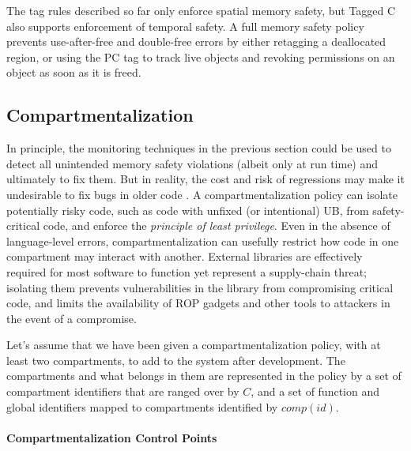 \documentclass{llncs}
\begin{document}
The tag rules described so far only enforce spatial memory safety, but Tagged C also
supports enforcement of temporal safety. A full memory safety policy prevents use-after-free and
double-free errors by either retagging a deallocated region, or using the PC tag
to track live objects and revoking permissions on an object as soon as it is freed.

\subsection{Compartmentalization}

In principle, the monitoring techniques in the previous section could be used
to detect all unintended memory safety violations (albeit only at run time) and ultimately to fix them.
But in reality, the cost and risk of regressions may make it
undesirable to fix bugs in older code \cite{Bessey10:Coverity}.  
%
A compartmentalization policy can isolate potentially risky code, such as code with unfixed
(or intentional) UB, from safety-critical code, and enforce the {\em principle of least privilege}. 
Even in the absence of language-level errors, compartmentalization can usefully 
restrict how code in one compartment may interact with another. External libraries are
effectively required for most software to function yet represent a supply-chain threat; isolating 
them prevents vulnerabilities in the library from compromising critical code,
and limits the availability of ROP gadgets and other tools to attackers in the event of a compromise.

Let's assume that we have been given a compartmentalization policy, with at least two compartments, to add to the system
after development. The compartments and what belongs in them are represented in the policy by a set of compartment identifiers that 
are ranged over by \(C\), and a set of function and global identifiers mapped to compartments identified by \(\mathit{comp}(id)\).

\paragraph*{Compartmentalization Control Points}
\end{document}
